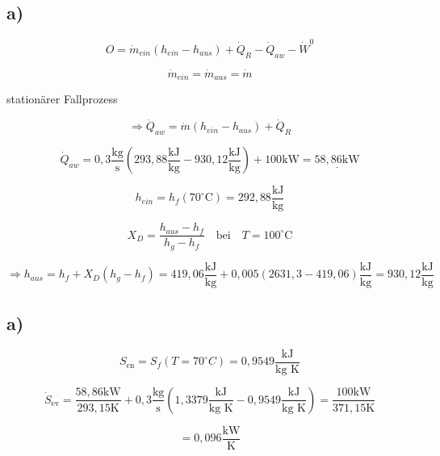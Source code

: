 

\subsection*{a)}

\begin{equation*}
O = \dot{m}_{ein} (h_{ein} - h_{aus}) + \dot{Q}_R - \dot{Q}_{aw} - \dot{W}^0
\end{equation*}

\begin{equation*}
\dot{m}_{ein} = \dot{m}_{aus} = \dot{m}
\end{equation*}

stationärer Fallprozess

\begin{equation*}
\Rightarrow \dot{Q}_{aw} = \dot{m} (h_{ein} - h_{aus}) + \dot{Q}_R
\end{equation*}

\begin{equation*}
\dot{Q}_{aw} = 0,3 \frac{\text{kg}}{\text{s}} (293,88 \frac{\text{kJ}}{\text{kg}} - 930,12 \frac{\text{kJ}}{\text{kg}}) + 100 \text{kW} = \underline{58,86 \text{kW}}
\end{equation*}

\begin{equation*}
h_{ein} = h_f \left( 70^\circ \text{C} \right) = 292,88 \frac{\text{kJ}}{\text{kg}}
\end{equation*}

\begin{equation*}
X_D = \frac{h_{aus} - h_f}{h_g - h_f} \quad \text{bei} \quad T = 100^\circ \text{C}
\end{equation*}

\begin{equation*}
\Rightarrow h_{aus} = h_f + X_D (h_g - h_f) = 419,06 \frac{\text{kJ}}{\text{kg}} + 0,005 (2631,3 - 419,06) \frac{\text{kJ}}{\text{kg}} = 930,12 \frac{\text{kJ}}{\text{kg}}
\end{equation*}



\subsection*{a)}

\[
S_{\text{en}} = S_f(T=70^\circ C) = 0{,}9549 \frac{\text{kJ}}{\text{kg K}}
\]

\[
\dot{S}_{\text{ev}} = \frac{58{,}86 \text{kW}}{293{,}15 \text{K}} + 0{,}3 \frac{\text{kg}}{\text{s}} \left(1{,}3379 \frac{\text{kJ}}{\text{kg K}} - 0{,}9549 \frac{\text{kJ}}{\text{kg K}}\right) = \frac{100 \text{kW}}{371{,}15 \text{K}}
\]

\[
= 0{,}096 \frac{\text{kW}}{\text{K}}
\]